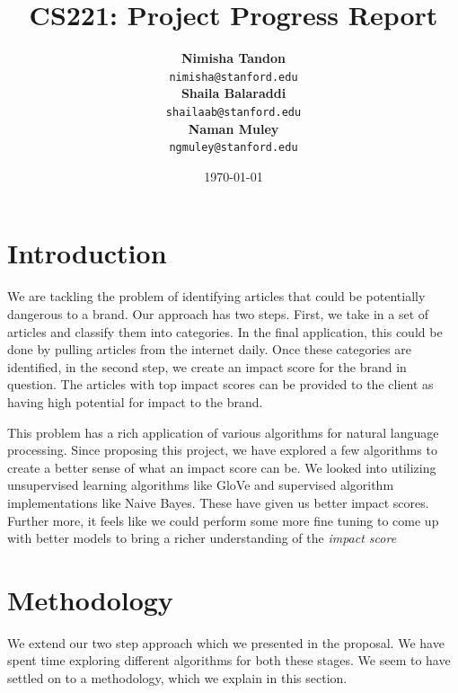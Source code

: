 \documentclass{article}
\title{CS221: Project Progress Report} %
\author{	\textbf{Nimisha Tandon}\\  \texttt{nimisha@stanford.edu} \\
		\textbf{Shaila Balaraddi}\\  \texttt{shailaab@stanford.edu} \\
		\textbf{Naman Muley}\\      \texttt{ngmuley@stanford.edu}}
\date{\today} %
\begin{document}
\maketitle %


\section{Introduction} %

We are tackling the problem of identifying articles that could be potentially dangerous to a brand. Our approach has two steps. First, we take in a set of articles and classify them into categories. In the final application, this could be done by pulling articles from the internet daily. Once these categories are identified, in the second step, we create an impact score for the brand in question. The articles with top impact scores can be provided to the client as having high potential for impact to the brand.

This problem has a rich application of various algorithms for natural language processing. Since proposing this project, we have explored a few algorithms to create a better sense of what an impact score can be. We looked into utilizing unsupervised learning algorithms like GloVe and supervised algorithm implementations like Naive Bayes. These have given us better impact scores. Further more, it feels like we could perform some more fine tuning to come up with better models to bring a richer understanding of the \textit{impact score}

\maketitle %
\section{Methodology} %
We extend our two step approach which we presented in the proposal. We have spent time exploring different algorithms for both these stages. We seem to have settled on to a methodology, which we explain in this section.
\end{document}
